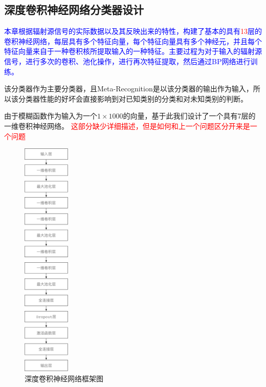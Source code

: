 \subsection{深度卷积神经网络分类器设计}
\textcolor{blue}{本章根据辐射源信号的实际数据以及其反映出来的特性，构建了基本的具有\textcolor{red}{13}层的卷积神经网络，每层具有多个特征向量，每个特征向量具有多个神经元，并且每个特征向量来自于一种卷积核所提取输入的一种特征。主要过程为对于输入的辐射源信号，进行多次的卷积、池化操作，进行再次特征提取，然后通过BP网络进行训练。
}

该分类器作为主要分类器，且Meta-Recognition是以该分类器的输出作为输入，所以该分类器性能的好坏会直接影响到对已知类别的分类和对未知类别的判断。

由于模糊函数作为输入为一个$1 \times 1000$的向量，基于此我们设计了一个具有7层的一维卷积神经网络。
\textcolor{red}{这部分缺少详细描述，但是如何和上一个问题区分开来是一个问题}

\begin{figure}
	\centering
	\includegraphics[width=0.2\textwidth]{figures/struct_emitter.pdf}
	\caption{深度卷积神经网络框架图}
\end{figure}


